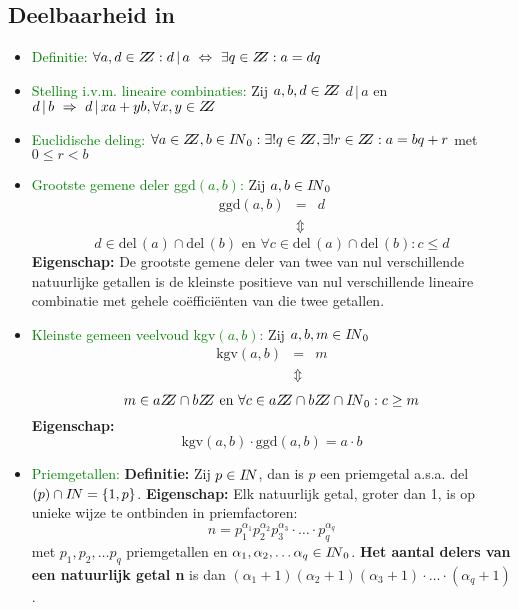 \subsection{Deelbaarheid in \Z} \label{deelbaarheid}
\hypertarget{deelbaarheid}{}
\begin{itemize}%
\item \textcolor{green}{Definitie:}
$\forall a, d \in \Z: d\,|\,a\ \Leftrightarrow\ \exists q\in \Z: a=dq$
\item \textcolor{green}{Stelling i.v.m. lineaire combinaties:}\newline
Zij $a,b,d \in \mbox{$Z \!\! Z$}$\newline
$d\,|\,a$ en $d\,|\,b \ \Rightarrow\ d\,|\,xa+yb, \forall x, y \in \mbox{$Z \!\! Z$}$
\item \textcolor{green}{Euclidische deling:}\newline
$\forall a \in \mbox{$Z \!\! Z$}, b \in \mbox{$I\!N$}_0: \exists ! q\in \mbox{$Z \!\! Z$}, \exists ! r \in \mbox{$Z \!\! Z$}: a=bq+r$ met $0\leq r< b$
\item \textcolor{green}{Grootste gemene deler ggd$(a, b)$:}\newline
Zij $a, b \in \mbox{$I\!N$}_0$
\begin{eqnarray*}
\mbox{ggd}(a, b) & = & d\\
  & \Updownarrow & 
\end{eqnarray*}
\[ d \in \mbox{del}\,(a) \cap \mbox{del}\,(b) \mbox{ en } \forall c \in \mbox{del}\,(a) \cap \mbox{del} \,(b) : c \leq d \]\newline
{\bf Eigenschap:} De grootste gemene deler van twee van nul verschillende natuurlijke getallen is de kleinste positieve van nul verschillende lineaire combinatie met gehele co\"effici\"enten van die twee getallen.\vskip 0.5cm
\item \textcolor{green}{Kleinste gemeen veelvoud kgv$(a, b)$:}\newline
Zij $a, b, m \in \mbox{$I\!N$}_0$
\begin{eqnarray*}
\mbox{kgv}(a, b) & = & m\\
  & \Updownarrow & 
\end{eqnarray*}
\[ m \in a\Z \cap b\Z \mbox{ en } \forall c \in a\Z \cap b\Z \cap \N_0: c \geq m \]\newline
{\bf Eigenschap: } \[\mbox{kgv}(a, b)\cdot\mbox{ggd}(a, b)=a\cdot b\]
\item \textcolor{green}{Priemgetallen:}\newline
{\bf Definitie: }Zij $p \in \mbox{$I\!N$}$, dan is $p$ een priemgetal a.s.a. del$(p) \cap \mbox{$I\!N$}=\{1, p\}$.\newline
{\bf Eigenschap: } Elk natuurlijk getal, groter dan 1, is op unieke wijze te ontbinden in priemfactoren: \[n=p_1^{\alpha_1}p_2^{\alpha_2}p_3^{\alpha_3}\cdot\ldots\cdot p_q^{\alpha_q}\]
met $p_1, p_2, \ldots p_q$ priemgetallen en $\alpha_1, \alpha_2,\ldots\alpha_q \in \mbox{$I\!N$}_0$.\newline
{\bf Het aantal delers van een natuurlijk getal n} is dan $(\alpha_1+1)(\alpha_2+1)(\alpha_3+1)\cdot\ldots\cdot(\alpha_q+1)$.
\end{itemize}%

